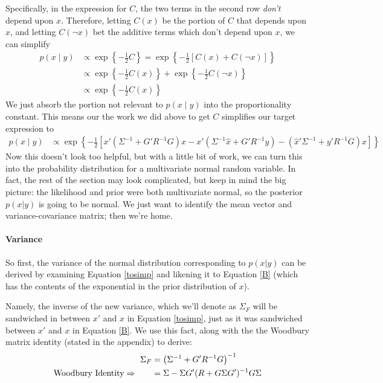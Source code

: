 \documentclass[a4paper,12pt]{scrartcl}
\begin{document}
Specifically, in the expression for $C$, the two terms
in the second row \emph{don't} depend upon $x$. Therefore,
letting $C(x)$ be the portion of $C$ that depends upon
$x$, and letting $C(\lnot x)$ bet the additive terms which
don't depend upon $x$, we can simplify
\begin{align*}
    p(x\; | \; y) &\propto \exp\left\{ -\frac{1}{2}
	C \right\} = \exp\left\{ -\frac{1}{2}
	\left[C(x) + C(\lnot x) \right]\right\}  \\
    &\propto \exp\left\{ -\frac{1}{2}
	C(x)\right\} +  \exp\left\{ -\frac{1}{2} C(\lnot x) 
	\right\}  \\
    &\propto \exp\left\{ -\frac{1}{2}
	C(x)\right\}
\end{align*}
We just absorb the portion not relevant to $p(x\;|\;y)$ into
the proportionality constant.  This means our the work we
did above to get $C$ simplifies our target expression to
\begin{align}
    p(x\;|\;y) &\propto \exp\left\{-\frac{1}{2} \left[
	x' \left( \Sigma^{-1} + G'R^{-1}G\right) x 
	- x' (\Sigma^{-1} \hat{x} + G'R^{-1}y)
	- (\hat{x}' \Sigma^{-1} + y' R^{-1}G) x  \right]\right\}
	\label{tosimp}
\end{align}
Now this doesn't look too helpful, but with a little bit of 
work, we can turn this into the probability distribution
for a multivariate normal random variable. 
In fact, the rest of the section may look complicated, but
keep in mind the big picture: the likelihood and prior
were both multivariate normal, so 
the posterior $p(x|y)$ is going to be normal. We just want
to identify the mean vector and variance-covariance matrix;
then we're home.

\paragraph{Variance} So first, the {variance} of the 
normal distribution corresponding to $p(x|y)$ can
be derived by examining Equation \ref{tosimp} and likening
it to Equation \ref{B} (which has the contents of the 
exponential in the prior distribution of $x$).  

Namely, the inverse of the new variance,
which we'll denote as $\Sigma_F$ will be sandwiched in 
between $x'$ and $x$ in Equation \ref{tosimp}, just as it 
was sandwiched between $x'$ and $x$ in Equation \ref{B}.
We use this fact, along with the 
the Woodbury matrix identity (stated in 
the appendix) to derive:
\begin{align}
    \Sigma_{F} &= \left( \Sigma^{-1} + G'R^{-1}G\right)^{-1} 
	\notag \\
    \text{Woodbury Identity} \Rightarrow
	\qquad &=  \Sigma - \Sigma G'(R 
	    + G\Sigma G')^{-1}
	    G\Sigma
	    \label{covar}
\end{align}
\end{document}
